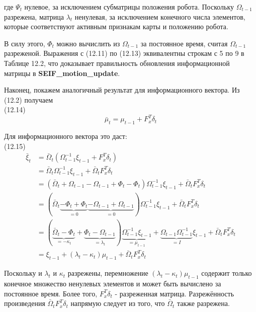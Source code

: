 \documentclass[10pt,a4paper]{article}
\begin{document}
где $\varPsi_t$ нулевое, за исключением субматрицы положения робота. Поскольку $\varOmega_{t-1}$ разрежена, матрица $\lambda_t$ ненулевая, за исключением конечного числа элементов, которые соответствуют активным признакам карты и положению робота.

В силу этого, $\varPhi_t$ можно вычислить из $\varOmega_{t-1}$ за постоянное время, считая  $\varOmega_{t-1}$ разреженой. Выражения с (12.11) по (12.13) эквивалентны строкам с 5 по 9 в Таблице 12.2, что доказывает правильность обновления информационной матрицы в \textbf{SEIF\_motion\_update}.

Наконец, покажем аналогичный результат для информационного вектора. Из (12.2) получаем\\

(12.14)
$$\bar{\mu}_t=\mu_{t-1}+F_x^T\delta_t$$

Для информационного вектора это даст:\\

(12.15)
\begin{equation*}
\begin{split}
\bar{\xi}_t&=\bar{\varOmega}_t(\varOmega_{t-1}^{-1}\xi_{t-1}+F_x^T\delta_t)\\
&=\bar{\varOmega}_t\varOmega_{t-1}^{-1}\xi_{t-1}+\bar{\varOmega}_tF_x^T\delta_t\\
&=(\bar{\varOmega}_t+\varOmega_{t-1}-\varOmega_{t-1}+\varPhi_t-\varPhi_t)\varOmega_{t-1}^{-1}\xi_{t-1}+\bar{\varOmega}_tF_x^T\delta_t\\
&=(\bar{\varOmega}_t\underbrace{-\varPhi_t+\varPhi_t}_{=0}\underbrace{-\varOmega_{t-1}+\varOmega_{t-1}}_{=0})\varOmega_{t-1}^{-1}\xi_{t-1}+\bar{\varOmega}_tF_x^T\delta_t\\
&=(\underbrace{\bar{\varOmega}_t-\varPhi_t}_{=-\kappa_t}+\underbrace{\varPhi_t-\varOmega_{t-1}}_{=\lambda_t})\underbrace{\varOmega_{t-1}^{-1}\xi_{t-1}}_{=\mu_{t-1}}+\underbrace{\varOmega_{t-1}\varOmega_{t-1}^{-1}}_{=I}\xi_{t-1}+\bar{\varOmega}_tF_x^T\delta_t\\
&=\xi_{t-1}+(\lambda_t-\kappa_t)\mu_{t-1}+\bar{\varOmega}_tF_x^T\delta_t
\end{split}
\end{equation*}

Поскольку и $\lambda_t$ и $\kappa_t$ разрежены, перемножение $(\lambda_t-\kappa_t)\mu_{t-1}$ содержит только конечное множество ненулевых элементов и может быть вычислено за постоянное время. Более того, $F_x^T\delta_t$ - разреженная матрица. Разрежённость произведения $\bar{\varOmega}_tF_x^T\delta_t$ напрямую следует из того, что $\bar{\varOmega}_t$ также разрежена.\\
\end{document}

